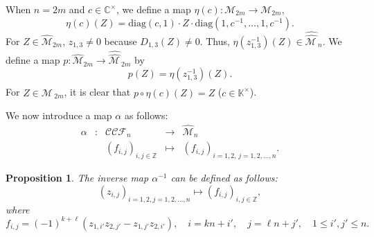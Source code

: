\documentclass[11pt]{amsart}
\theoremstyle{plain}
\newtheorem{proposition}{Proposition}
\theoremstyle{definition}
\theoremstyle{remark}
\begin{document}
When $n=2m$ and $c\in\mathbb{C}^\times$, we define a map
$\eta(c): \mathcal{M}_{2m}  \to  \mathcal{M}_{2m}$,
\begin{equation}
\eta(c)(Z)=
\mathrm{diag}(c, 1)\cdot Z \cdot\mathrm{diag}(1, c^{-1},\ldots, 1, c^{-1}).
\end{equation}
For $Z\in \widehat{\mathcal{M}}_{2m}$, $z_{1,3}\ne 0$ because $D_{1,3}(Z)\ne 0$. Thus, $\eta(z_{1,3}^{-1})(Z)\in \widehat{\widehat{\mathcal{M\,}}}_{n}$. We define
a map $p: \widehat{\mathcal{M}}_{2m}\rightarrow \widehat{\widehat{\mathcal{M\,}}}_{2m}$ by
\begin{equation}
p(Z)=\eta(z_{1,3}^{-1})(Z).
\end{equation}
For $Z\in \widehat{\widehat{\mathcal{M\,}}}_{2m}$, it is clear that $p \circ \eta(c)(Z)=Z$ ($c\in\mathbb{K}^\times$).

We now introduce a map $\alpha$ as follows: %
\begin{equation}
\begin{array}{ccccc}
\alpha & : & \mathcal{CCF}_n & \to & \widehat{\mathcal{M}}_n \\
&& (f_{i,j})_{i,j \in \mathbb{Z}} & \mapsto & (f_{i,j})_{i=1,2, \, j=1,2,\dots,n}.
\end{array}
\end{equation}

\begin{proposition}
The inverse map $\alpha^{-1}$ can be defined as follows:
\begin{equation}
(z_{i, j})_{i=1, 2, j=1, 2,...,n} \mapsto (f_{i,j})_{i,j \in \mathbb{Z}},
\end{equation}
where
\begin{equation} \label{eq:alphaInv}
f_{i, j} = (-1)^{k+\ell}(z_{1, i'}z_{2, j'}-z_{1, j'}z_{2, i'}), \quad i=kn+i', \quad j=\ell n+j', \quad 1 \leq i', j' \leq n.
\end{equation}
\end{proposition}
\end{document}
